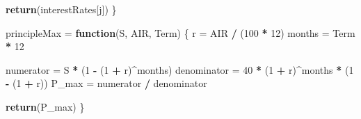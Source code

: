 \documentclass[12pt]{article}
\newenvironment{Section}[1]{}{\newpage}
\newenvironment{Shaded}{\begin{snugshade}}{\end{snugshade}}
\newcommand{\CommentTok}[1]{\textcolor[rgb]{0.56,0.35,0.01}{\textit{#1}}}
\newcommand{\ControlFlowTok}[1]{\textcolor[rgb]{0.13,0.29,0.53}{\textbf{#1}}}
\newcommand{\DecValTok}[1]{\textcolor[rgb]{0.00,0.00,0.81}{#1}}
\newcommand{\KeywordTok}[1]{\textcolor[rgb]{0.13,0.29,0.53}{\textbf{#1}}}
\newcommand{\NormalTok}[1]{#1}
\newcommand{\OperatorTok}[1]{\textcolor[rgb]{0.81,0.36,0.00}{\textbf{#1}}}
\newcommand{\StringTok}[1]{\textcolor[rgb]{0.31,0.60,0.02}{#1}}
\begin{document}
\begin{Section}{Example A}
\begin{singlespace}
\begin{Shaded}
\begin{Highlighting}
  \KeywordTok{return}\NormalTok{(interestRates[j])}
\NormalTok{\}}

\NormalTok{principleMax =}\StringTok{ }\ControlFlowTok{function}\NormalTok{(S, AIR, Term) \{}
\NormalTok{  r =}\StringTok{ }\NormalTok{AIR }\OperatorTok{/}\StringTok{ }\NormalTok{(}\DecValTok{100} \OperatorTok{*}\StringTok{ }\DecValTok{12}\NormalTok{)}
\NormalTok{  months =}\StringTok{ }\NormalTok{Term }\OperatorTok{*}\StringTok{ }\DecValTok{12}

\NormalTok{  numerator =}\StringTok{ }\NormalTok{S }\OperatorTok{*}\StringTok{ }\NormalTok{(}\DecValTok{1} \OperatorTok{-}\StringTok{ }\NormalTok{(}\DecValTok{1} \OperatorTok{+}\StringTok{ }\NormalTok{r)}\OperatorTok{^}\NormalTok{months)}
\NormalTok{  denominator =}\StringTok{ }\DecValTok{40} \OperatorTok{*}\StringTok{ }\NormalTok{(}\DecValTok{1} \OperatorTok{+}\StringTok{ }\NormalTok{r)}\OperatorTok{^}\NormalTok{months }\OperatorTok{*}\StringTok{ }\NormalTok{(}\DecValTok{1} \OperatorTok{-}\StringTok{ }\NormalTok{(}\DecValTok{1} \OperatorTok{+}\StringTok{ }\NormalTok{r))}
\NormalTok{  P_max =}\StringTok{ }\NormalTok{numerator }\OperatorTok{/}\StringTok{ }\NormalTok{denominator}

  \KeywordTok{return}\NormalTok{(P_max)}
\NormalTok{\}}
\end{Highlighting}
\end{Shaded}

\end{singlespace}	
\newpage
\begin{singlespace}
\begin{Shaded}
\end{Shaded}


\end{singlespace}
\end{Section}
\end{document}
